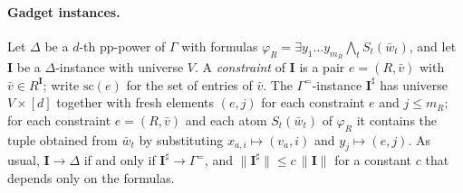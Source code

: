 \documentclass[11pt]{article}
\theoremstyle{definition}
\theoremstyle{remark}
\newcommand{\size}[1]{\lVert #1\rVert}
\begin{document}
\paragraph{Gadget instances.} Let $\Delta$ be a $d$-th pp-power of $\Gamma$
with formulas $\varphi_R=\exists y_1\dots y_{m_R}\bigwedge_t S_t(\bar w_t)$,
and let $\mathbf I$ be a $\Delta$-instance with universe $V$. A
\emph{constraint} of $\mathbf I$ is a pair $e=(R,\bar v)$ with
$\bar v\in R^{\mathbf I}$; write $\mathrm{sc}(e)$ for the set of entries of
$\bar v$. The $\Gamma^{=}$-instance $\mathbf I^\sharp$ has universe
$V\times[d]$ together with fresh elements $(e,j)$ for each constraint $e$ and
$j\le m_R$; for each constraint $e=(R,\bar v)$ and each atom $S_t(\bar w_t)$
of $\varphi_R$ it contains the tuple obtained from $\bar w_t$ by substituting
$x_{a,i}\mapsto(v_a,i)$ and $y_j\mapsto(e,j)$. As usual,
$\mathbf I\to\Delta$ if and only if $\mathbf I^\sharp\to\Gamma^{=}$, and
$\size{\mathbf I^\sharp}\le c\,\size{\mathbf I}$ for a constant $c$ that
depends only on the formulas.
\end{document}
